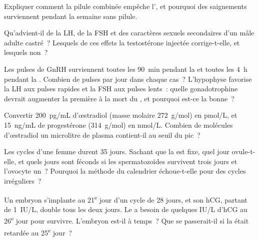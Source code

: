 \begin{exercise}[$\star$]\label{exo:b2:reproductive-hormones:3}
Expliquer comment la pilule combinée empêche l', et pourquoi
des saignements surviennent pendant la semaine sans pilule.
\end{exercise}

\begin{exercise}[$\star$]\label{exo:b2:reproductive-hormones:4}
Qu'advient-il de la LH, de la FSH et des caractères sexuels secondaires
d'un mâle adulte castré~? Lesquels de ces effets la testostérone
injectée corrige-t-elle, et lesquels non~?
\end{exercise}

\begin{exercise}[$\star\star$]\label{exo:b2:reproductive-hormones:5}
Les pulses de GnRH surviennent toutes les \qty{90}{min} pendant la  et toutes les \qty{4}{h} pendant la . Combien
de pulses par jour dans chaque cas~? L'hypophyse favorise la LH aux
pulses rapides et la FSH aux pulses lents~: quelle gonadotrophine
devrait augmenter la première à la mort du , et pourquoi
est-ce la bonne~?
\end{exercise}

\begin{exercise}[$\star\star$]\label{exo:b2:reproductive-hormones:6}
Convertir \qty{200}{pg/mL} d'œstradiol (masse molaire
\qty{272}{g/mol}) en \unit{pmol/L}, et \qty{15}{ng/mL} de progestérone
(\qty{314}{g/mol}) en \unit{nmol/L}. Combien de molécules d'œstradiol
un microlitre de plasma contient-il au seuil du pic~?
\end{exercise}

\begin{exercise}[$\star\star$]\label{exo:b2:reproductive-hormones:7}
Les cycles d'une femme durent 35 jours. Sachant que la  est
fixe, quel jour ovule-t-elle, et quels jours sont féconds si les
spermatozoïdes survivent trois jours et l'ovocyte un~? Pourquoi la méthode
du calendrier échoue-t-elle pour des cycles irréguliers~?
\end{exercise}

\begin{exercise}[$\star\star$]\label{exo:b2:reproductive-hormones:8}
Un embryon s'implante au 21\textsuperscript{e} jour d'un cycle de
28 jours, et son hCG, partant de \qty{1}{IU/L}, double tous les deux
jours. Le  a besoin de quelques IU/L d'hCG au
26\textsuperscript{e} jour pour survivre. L'embryon est-il à temps~?
Que se passerait-il si la  était retardée au
25\textsuperscript{e} jour~?
\end{exercise}

